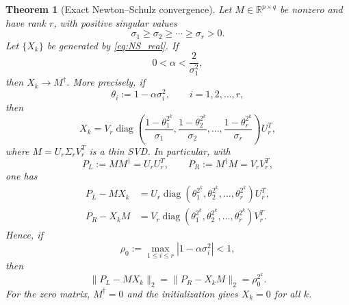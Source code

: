 \documentclass[12pt,a4paper]{article}
\theoremstyle{plain}
\newtheorem{theorem}{Theorem}[section]
\theoremstyle{definition}
\theoremstyle{remark}
\begin{document}
\begin{theorem}[Exact Newton--Schulz convergence] \label{theorem1}
Let \(M\in\mathbb{R}^{p\times q}\) be nonzero and have rank \(r\), with positive singular values
\[
    \sigma_1\geq\sigma_2\geq\cdots\geq\sigma_r>0.
\]
Let \(\{X_k\}\) be generated by \eqref{eq:NS_real}. If
\begin{equation} \label{eq:alpha_interval}
    0<\alpha<\frac{2}{\sigma_1^2},
\end{equation}
then \(X_k\to M^\dagger\). More precisely, if
\[
    \theta_i:=1-\alpha\sigma_i^2, \qquad i=1,2,\ldots,r,
\]
then
\begin{equation}\label{eq:Xk_exact_formula}
    X_k =V_r\operatorname{diag}\!\left( \frac{1-\theta_1^{2^k}}{\sigma_1},\frac{1-\theta_2^{2^k}}{\sigma_2},\ldots, \frac{1-\theta_r^{2^k}}{\sigma_r} \right)U_r^T,
\end{equation}
where \(M=U_r\Sigma_rV_r^T\) is a thin SVD. In particular, with
\[
    P_L:=MM^\dagger=U_rU_r^T, \qquad P_R:=M^\dagger M=V_rV_r^T,
\]
one has
\begin{align}
    P_L-MX_k &=U_r\operatorname{diag}(\theta_1^{2^k},\theta_2^{2^k},\ldots,\theta_r^{2^k})U_r^T, \label{eq:left_projector_residual}
    \\ P_R-X_kM &=V_r\operatorname{diag}(\theta_1^{2^k},\theta_2^{2^k},\ldots,\theta_r^{2^k})V_r^T. \label{eq:right_projector_residual}
\end{align}
Hence, if
\[
    \rho_0:=\max_{1\leq i\leq r}|1-\alpha\sigma_i^2|<1,
\]
then
\begin{equation} \label{eq:projector_residual_rate}
    \|P_L-MX_k\|_2 =\|P_R-X_kM\|_2 =\rho_0^{2^k}.
\end{equation}
For the zero matrix, \(M^\dagger=0\) and the initialization gives \(X_k=0\) for all \(k\).
\end{theorem}
\end{document}
